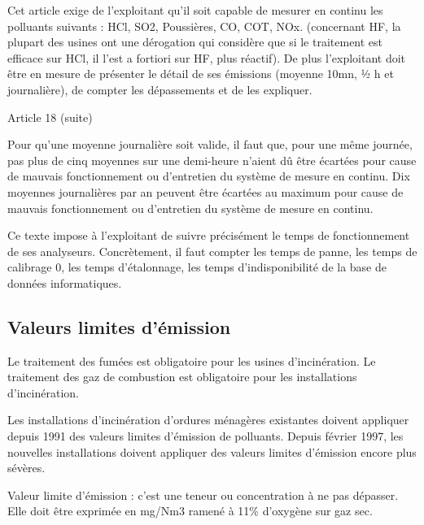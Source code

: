 Cet article exige de l’exploitant qu’il soit capable de mesurer en continu les polluants suivants : HCl, SO2, Poussières, CO, COT, NOx.
(concernant HF, la plupart des usines ont une dérogation qui considère que si le traitement est efficace sur HCl, il l’est a fortiori sur HF, plus réactif).
De plus l’exploitant doit être en mesure de présenter le détail de ses émissions (moyenne 10mn, ½ h et journalière), de compter les dépassements et de les expliquer.


\vspace{0.3cm}

Article 18 (suite)
\vspace{0.3cm}

\begin{tcolorbox}[colback=blue!5!white,colframe=blue!75!black]
Pour qu’une moyenne journalière soit valide, il faut que, pour une même journée, pas plus de cinq moyennes sur une demi-heure n’aient dû être écartées pour cause de mauvais fonctionnement ou d’entretien du système de mesure en continu. Dix moyennes journalières par an peuvent être écartées au maximum pour cause de mauvais fonctionnement ou d’entretien du système de mesure en continu.
\end{tcolorbox}


\vspace{0.3cm}

Ce texte impose à l’exploitant de suivre précisément le temps de fonctionnement de ses analyseurs. Concrètement, il faut compter les temps de panne, les temps de calibrage 0, les temps d’étalonnage, les temps d’indisponibilité de la base de données informatiques.


\subsection{Valeurs limites d'émission}

Le traitement des fumées est obligatoire pour les usines d'incinération.
Le traitement des gaz de combustion est obligatoire pour les installations d’incinération.
\vspace{0.3cm}

Les installations d’incinération d’ordures ménagères existantes doivent appliquer depuis 1991 des valeurs limites d’émission de polluants. Depuis février 1997, les nouvelles installations doivent appliquer des valeurs limites d’émission encore plus sévères.

\vspace{0.3cm}

Valeur limite d’émission : c’est une teneur ou concentration à ne pas dépasser. 
Elle doit être exprimée en mg/Nm3 ramené à 11\% d’oxygène sur gaz sec.

